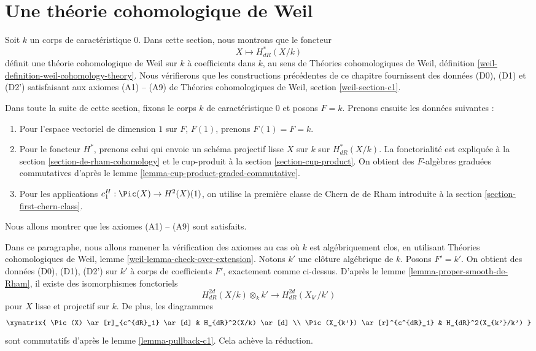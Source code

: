 \section{Une théorie cohomologique de Weil}
\label{section-weil}

\noindent
Soit $k$ un corps de caractéristique $0$. Dans cette section, nous montrons que
le foncteur
$$
X \longmapsto H^*_{dR}(X/k)
$$
définit une théorie cohomologique de Weil sur $k$ à coefficients dans $k$, au sens
de Théories cohomologiques de Weil, définition
\ref{weil-definition-weil-cohomology-theory}.
Nous vérifierons que les constructions précédentes de ce
chapitre fournissent des données (D0), (D1) et (D2') satisfaisant
aux axiomes (A1) -- (A9) de
Théories cohomologiques de Weil, section \ref{weil-section-c1}.

\medskip\noindent
Dans toute la suite de cette section, fixons le corps $k$ de caractéristique
$0$ et posons $F = k$. Prenons ensuite les données suivantes :
\begin{enumerate}
\item[(D0)] Pour l'espace vectoriel de dimension $1$ sur $F$, $F(1)$, prenons
$F(1) = F = k$.
\item[(D1)] Pour le foncteur $H^*$, prenons celui qui envoie
un schéma projectif lisse $X$ sur $k$ sur $H^*_{dR}(X/k)$.
La fonctorialité est expliquée à la section \ref{section-de-rham-cohomology}
et le cup-produit à la section \ref{section-cup-product}.
On obtient des $F$-algèbres graduées commutatives d'après
le lemme \ref{lemma-cup-product-graded-commutative}.
\item[(D2')] Pour les applications $c_1^H : \Pic(X) \to H^2(X)(1)$, on
utilise la première classe de Chern de de Rham introduite à la
section \ref{section-first-chern-class}.
\end{enumerate}
Nous allons montrer que les axiomes (A1) -- (A9) sont satisfaits.

\medskip\noindent
Dans ce paragraphe, nous allons ramener la vérification des
axiomes au cas où $k$ est algébriquement clos, en
utilisant Théories cohomologiques de Weil, lemme \ref{weil-lemma-check-over-extension}.
Notons $k'$ une clôture algébrique de $k$.
Posons $F' = k'$. On obtient des données (D0), (D1), (D2') sur $k'$ à
corps de coefficients $F'$, exactement comme ci-dessus.
D'après le lemme \ref{lemma-proper-smooth-de-Rham}, il existe des
isomorphismes fonctoriels
$$
H_{dR}^{2d}(X/k) \otimes_k k'
\longrightarrow
H_{dR}^{2d}(X_{k'}/k')
$$
pour $X$ lisse et projectif sur $k$. De plus, les diagrammes
$$
\xymatrix{
\Pic(X) \ar[r]_{c^{dR}_1} \ar[d] & H_{dR}^2(X/k) \ar[d] \\
\Pic(X_{k'}) \ar[r]^{c^{dR}_1} & H_{dR}^2(X_{k'}/k')
}
$$
sont commutatifs d'après le lemme \ref{lemma-pullback-c1}.
Cela achève la réduction.


